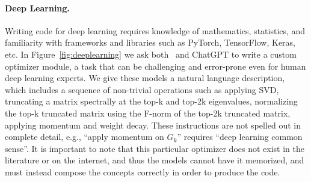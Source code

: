 \paragraph{Deep Learning.}
Writing code for deep learning requires knowledge of mathematics, statistics, and familiarity with frameworks and libraries such as PyTorch, TensorFlow, Keras, etc. 
In Figure~\ref{fig:deeplearning} we ask both \DV\ and ChatGPT to write a custom optimizer module, a task that can be challenging and error-prone even for human deep learning experts. We give these models a natural language description, which includes a sequence of non-trivial operations such as applying SVD, truncating a matrix spectrally at the top-k and top-2k eigenvalues, normalizing the top-k truncated matrix using the F-norm of the top-2k truncated matrix, applying momentum and weight decay.
These instructions are not spelled out in complete detail, e.g., ``apply momentum on $G_k$'' requires ``deep learning common sense''.
It is important to note that this particular optimizer does not exist in the literature or on the internet, and thus the models cannot have it memorized, and must instead compose the concepts correctly in order to produce the code. 









